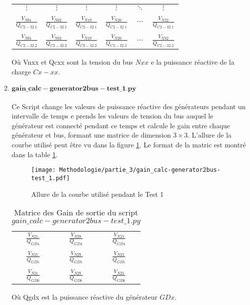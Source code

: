 \begin{enumerate}[\bfseries 5.1]
\begin{table}[H]
{\begin{tabular}{cccccc}
				$ \vdots $&$ \vdots $&$ \vdots $&$ \vdots $&$ \ddots $&$ \vdots $\\
				&&&&&\\
				$\frac{V_{N01}}{Q_{C 2-32.1}}$& $\frac{V_{N02}}{Q_{C 2-32.1}}$& $\frac{V_{N19}}{Q_{C 2-32.1}}$& $\frac{V_{N20}}{Q_{C 2-32.1}}$&$\cdots$&$\frac{V_{N32}}{Q_{C 2-32.1}}$\\
				&&&&&\\
				$\frac{V_{N01}}{Q_{C 2-32.2}}$& $\frac{V_{N02}}{Q_{C 2-32.2}}$& $\frac{V_{N19}}{Q_{C 2-32.2}}$& $\frac{V_{N20}}{Q_{C 2-32.2}}$&$\cdots$&$\frac{V_{N32}}{Q_{C 2-32.2}}$\\
		\end{tabular}}		
	\end{table}
	Où \gls{Vnxx}  et \gls{Qcxx} sont la tension du bus $ Nxx $ e la puissance réactive de la charge $ Cx-xx $.
	
	\item $\mathbf{gain\_calc-generator2bus-test\_1.py}$\\
	\\Ce Script change les valeurs de puissance réactive des générateurs pendant un intervalle de temps e prends les valeurs de tension du bus auquel le générateur est connecté pendant ce temps et calcule le gain entre chaque générateur et bus, formant une matrice de dimension $ 3\times3 $. L'allure de la courbe utilisé peut être vu dans la figure \ref{fig:gaincalcgenerator2bustest1}. Le format de la matric est montré dans la table \ref{tab:gaincalcgenerator2bustest1}.
	\begin{figure}[H]
		\begin{center}	
			\texttt{[image: Methodologie/partie\_3/gain\_calc-generator2bus-test\_1.pdf]}
			\caption{Allure de la courbe utilisé pendant le Test 1}
			\label{fig:gaincalcgenerator2bustest1}
		\end{center}
	\end{figure}
\begin{table}[H]
	\captionsetup{justification=centering,margin=2cm}
	\caption{Matrice des Gain de sortie du script $gain\_calc-generator2bus-test\_1.py$}
	\label{tab:gaincalcgenerator2bustest1}
	\centering
	\begin{tabular}{ccc}
		$ \frac{V_{N21}}{Q_{GD4}} $&$ \frac{V_{N29}}{Q_{GD4}} $&$ \frac{V_{N23}}{Q_{GD4}} $\\
		&&\\
		$ \frac{V_{N21}}{Q_{GD5}} $&$ \frac{V_{N29}}{Q_{GD5}} $&$ \frac{V_{N23}}{Q_{GD5}} $\\
		&&\\
		$ \frac{V_{N21}}{Q_{GD6}} $&$ \frac{V_{N29}}{Q_{GD6}} $&$ \frac{V_{N23}}{Q_{GD6}} $\\
	\end{tabular}
\end{table}
Où \gls{Qgdx} est la puissance réactive du générateur $ GDx $.


\end{enumerate}
